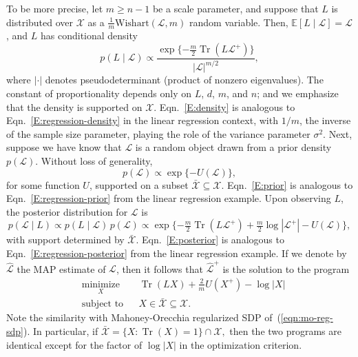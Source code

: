 \documentclass[12pt]{article}
\DeclareMathOperator*{\Tr}{Tr}
\newcommand{\E}{\mathbb{E}}
\theoremstyle{plain}
\begin{document}
To be more precise, let $m \geq n - 1$ be a scale parameter, and suppose 
that $L$ is distributed over $\mathcal{X}$ as a 
$\tfrac{1}{m} \mathrm{Wishart}(\mathcal{L}, m)$ random variable.
Then, $\E[L \mid \mathcal{L}] = \mathcal{L}$, and $L$ has conditional density
\begin{equation}\label{E:density}
  p(L \mid \mathcal{L})
    \propto
      \frac{\exp\{ -\frac{m}{2} \Tr(L \mathcal{L}^+)\}}
           {|\mathcal{L}|^{m/2}},
\end{equation}
where $|\cdot|$ denotes pseudodeterminant (product of nonzero eigenvalues).  
The constant of proportionality depends only on $L$, $d$, $m$, and $n$; and 
we emphasize that the density is supported on $\mathcal{X}$.
Eqn.~\eqref{E:density} is analogous to Eqn.~\eqref{E:regression-density}
in the linear regression context, with $1/m$, the inverse of the sample 
size parameter, playing the role of the variance parameter $\sigma^2$.
Next, suppose we have know that $\mathcal{L}$ is a random object drawn from 
a prior density $p(\mathcal{L})$.
Without loss of generality,
\begin{equation}
\label{E:prior}
  p(\mathcal{L}) \propto \exp\{ -U(\mathcal{L}) \},
\end{equation}
for some function $U$, supported on a subset 
$\mathcal{\bar X} \subseteq \mathcal{X}$.
Eqn.~\eqref{E:prior} is analogous to Eqn.~\eqref{E:regression-prior}
from the linear regression example.
Upon observing $L$, the posterior distribution for $\mathcal{L}$ is
\begin{equation}\label{E:posterior}
  p(\mathcal{L} \mid L)
    \propto p(L \mid \mathcal{L}) \, p (\mathcal{L})
    \propto \exp\{ -\tfrac{m}{2} \Tr(L \mathcal{L}^+)
                   + \tfrac{m}{2} \log |\mathcal{L}^+|
                   - U(\mathcal{L}) \},
\end{equation}
with support determined by $\mathcal{\bar X}$.  
Eqn.~\eqref{E:posterior} is analogous to Eqn.~\eqref{E:regression-posterior}
from the linear regression example.
If we denote by $\mathcal{\hat L}$ the MAP estimate of $\mathcal{L}$, then 
it follows that $\mathcal{\hat L}^+$ is the solution to the program
\begin{equation}
\begin{aligned}
  & \underset{X}{\text{minimize}}
  & & \Tr(L X) + \tfrac{2}{m} U(X^+) - \log |X| \\
  & \text{subject to}
  & & X \in \mathcal{\bar X} \subseteq \mathcal{X} .
\end{aligned}
\end{equation}
Note the similarity with Mahoney-Orecchia regularized SDP 
of~(\ref{eqn:mo-reg-sdp}).
In particular, if
\(
  \mathcal{\bar X} = \{ X : \Tr(X) = 1 \} \cap \mathcal{X},
\)
then the two programs are identical except for the factor of
$\log |X|$ in the optimization criterion.
\end{document}
